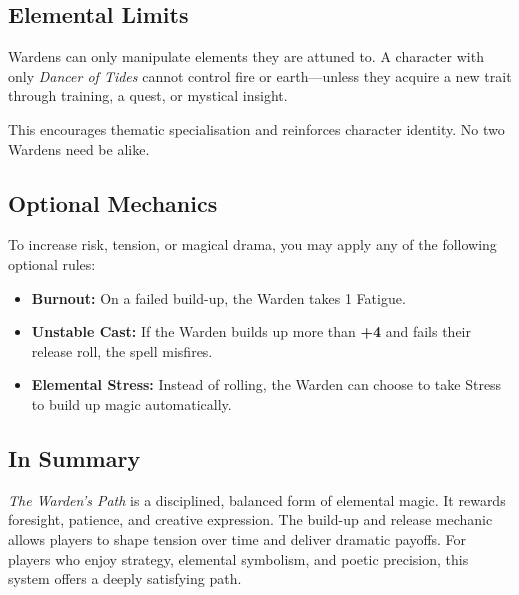 \subsection{Elemental Limits}

Wardens can only manipulate elements they are attuned to. A character with only \textit{Dancer of Tides} cannot control fire or earth—unless they acquire a new trait through training, a quest, or mystical insight.

This encourages thematic specialisation and reinforces character identity. No two Wardens need be alike.

\subsection{Optional Mechanics}

To increase risk, tension, or magical drama, you may apply any of the following optional rules:

\begin{itemize}
    \item \textbf{Burnout:} On a failed build-up, the Warden takes 1 Fatigue.
    \item \textbf{Unstable Cast:} If the Warden builds up more than \textbf{+4} and fails their release roll, the spell misfires.
    \item \textbf{Elemental Stress:} Instead of rolling, the Warden can choose to take Stress to build up magic automatically.
\end{itemize}

\subsection{In Summary}

\textit{The Warden’s Path} is a disciplined, balanced form of elemental magic. It rewards foresight, patience, and creative expression. The build-up and release mechanic allows players to shape tension over time and deliver dramatic payoffs. For players who enjoy strategy, elemental symbolism, and poetic precision, this system offers a deeply satisfying path.
